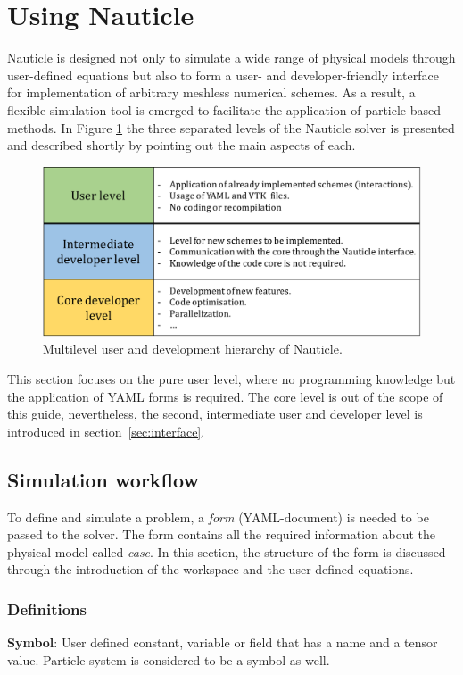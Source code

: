 \documentclass[a4paper,12pt,openany]{book}
\theoremstyle{break}
\begin{document}
\section{Using Nauticle} \label{sec:usage_of_nauticle}
Nauticle is designed not only to simulate a wide range of physical models through user-defined equations but also to form a user- and developer-friendly interface for implementation of arbitrary meshless numerical schemes. As a result, a flexible simulation tool is emerged to facilitate the application of particle-based methods. In Figure \ref{fig:three_levels} the three separated levels of the Nauticle solver is presented and described shortly by pointing out the main aspects of each.
\begin{figure}[H]
  \includegraphics[scale=0.55]{three_levels.pdf}
  \centering
  \caption{Multilevel user and development hierarchy of Nauticle.}
  \label{fig:three_levels}
\end{figure}
This section focuses on the pure user level, where no programming knowledge but the application of YAML forms is required. The core level is out of the scope of this guide, nevertheless, the second, intermediate user and developer level is introduced in section \ref{sec:interface}. 
\subsection{Simulation workflow} \label{sec:sim_workflow}
To define and simulate a problem, a \textit{form} (YAML-document) is needed to be passed to the solver. The form contains all the required information about the physical model called \textit{case}. In this section, the structure of the form is discussed through the introduction of the workspace and the user-defined equations.
\subsubsection{Definitions}
\textbf{Symbol}: User defined constant, variable or field that has a name and a tensor value. Particle system is considered to be a symbol as well.
\end{document}

